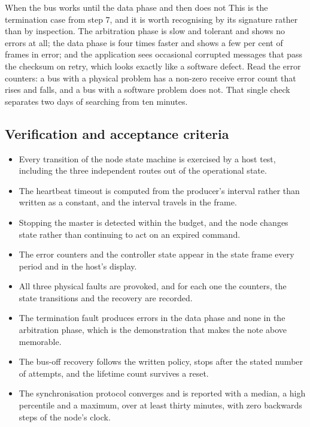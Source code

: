 \begin{note}{When the bus works until the data phase and then does not}
This is the termination case from step 7, and it is worth recognising by its
signature rather than by inspection. The arbitration phase is slow and tolerant
and shows no errors at all; the data phase is four times faster and shows a few
per cent of frames in error; and the application sees occasional corrupted
messages that pass the checksum on retry, which looks exactly like a software
defect. Read the error counters: a bus with a physical problem has a non-zero
receive error count that rises and falls, and a bus with a software problem does
not. That single check separates two days of searching from ten minutes.
\end{note}

\subsection*{Verification and acceptance criteria}

\begin{itemize}
\item Every transition of the node state machine is exercised by a host test,
including the three independent routes out of the operational state.
\item The heartbeat timeout is computed from the producer's interval rather than
written as a constant, and the interval travels in the frame.
\item Stopping the master is detected within the budget, and the node changes
state rather than continuing to act on an expired command.
\item The error counters and the controller state appear in the state frame
every period and in the host's display.
\item All three physical faults are provoked, and for each one the counters, the
state transitions and the recovery are recorded.
\item The termination fault produces errors in the data phase and none in the
arbitration phase, which is the demonstration that makes the note above
memorable.
\item The bus-off recovery follows the written policy, stops after the stated
number of attempts, and the lifetime count survives a reset.
\item The synchronisation protocol converges and is reported with a median, a
high percentile and a maximum, over at least thirty minutes, with zero backwards
steps of the node's clock.
\end{itemize}

